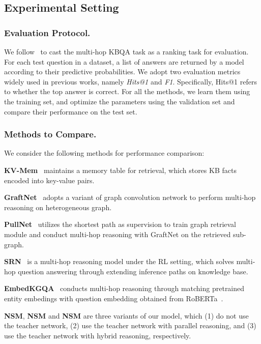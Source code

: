 \subsection{Experimental Setting}


\subsubsection{Evaluation Protocol.} 
We follow~\cite{GraftNet-EMNLP-2018,PullNet-EMNLP-2019} to cast the multi-hop KBQA task as a ranking task for evaluation.
For each test question in a dataset, a list of answers are returned by a model according to their predictive probabilities. We adopt two evaluation metrics widely used in previous works, namely \emph{Hits@1} and \emph{F1}.  Specifically, Hits@1 refers to whether the top answer is correct.
For all the methods, we learn them using the training set, and optimize the parameters using the validation set and compare their performance on the test set.

\subsubsection{Methods to Compare.} We consider the following methods for performance comparison:


     \textbf{KV-Mem}~\cite{KVMem-EMNLP-2016} maintains a memory table for retrieval, which stores KB facts encoded into key-value pairs.
	


	 \textbf{GraftNet}~\cite{GraftNet-EMNLP-2018} adopts a variant of graph convolution network to perform multi-hop reasoning on heterogeneous graph.
	
	 \textbf{PullNet}~\cite{PullNet-EMNLP-2019} utilizes the shortest path as supervision to train graph retrieval module and conduct multi-hop reasoning with GraftNet on the retrieved sub-graph.


	 \textbf{SRN}~\cite{SRN-WSDM-2020} is a multi-hop reasoning model under the RL setting, which solves multi-hop question answering through extending inference paths on knowledge base.


	 \textbf{EmbedKGQA}~\cite{Saxena-ACL-2020} conducts multi-hop reasoning through matching pretrained entity embedings with question embedding obtained from RoBERTa~\cite{RoBERTa-Liu-2019}.
	
 \textbf{NSM}, \textbf{NSM} and \textbf{NSM} are three variants of our model, which (1) do not use the teacher network, (2) use the teacher network with parallel reasoning, and (3) use the teacher network with hybrid reasoning, respectively.



